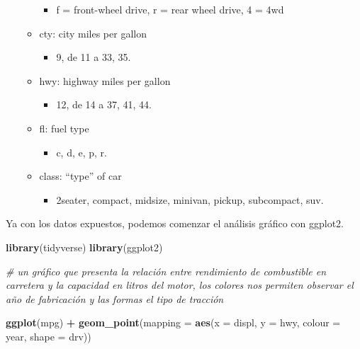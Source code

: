 \documentclass[
]{article}
\newenvironment{Shaded}{\begin{snugshade}}{\end{snugshade}}
\newcommand{\CommentTok}[1]{\textcolor[rgb]{0.56,0.35,0.01}{\textit{#1}}}
\newcommand{\DataTypeTok}[1]{\textcolor[rgb]{0.13,0.29,0.53}{#1}}
\newcommand{\KeywordTok}[1]{\textcolor[rgb]{0.13,0.29,0.53}{\textbf{#1}}}
\newcommand{\NormalTok}[1]{#1}
\newcommand{\OperatorTok}[1]{\textcolor[rgb]{0.81,0.36,0.00}{\textbf{#1}}}
\newcommand{\StringTok}[1]{\textcolor[rgb]{0.31,0.60,0.02}{#1}}
\providecommand{\tightlist}{%
  \setlength{\itemsep}{0pt}\setlength{\parskip}{0pt}}
\begin{document}
\begin{itemize}
\begin{itemize}
    \begin{itemize}
    \tightlist
    \item
      f = front-wheel drive, r = rear wheel drive, 4 = 4wd
    \end{itemize}
  \item
    cty: city miles per gallon

    \begin{itemize}
    \tightlist
    \item
      9, de 11 a 33, 35.
    \end{itemize}
  \item
    hwy: highway miles per gallon

    \begin{itemize}
    \tightlist
    \item
      12, de 14 a 37, 41, 44.
    \end{itemize}
  \item
    fl: fuel type

    \begin{itemize}
    \tightlist
    \item
      c, d, e, p, r.
    \end{itemize}
  \item
    class: ``type'' of car

    \begin{itemize}
    \tightlist
    \item
      2seater, compact, midsize, minivan, pickup, subcompact, suv.
    \end{itemize}
  \end{itemize}
\end{itemize}

Ya con los datos expuestos, podemos comenzar el análisis gráfico con
ggplot2.

\begin{Shaded}
\begin{Highlighting}[]
\KeywordTok{library}\NormalTok{(tidyverse)}
\KeywordTok{library}\NormalTok{(ggplot2)}

\CommentTok{\# un gráfico que presenta la relación entre rendimiento de combustible  en carretera y la capacidad en litros del motor, los colores nos permiten observar el año de fabricación y las formas el tipo de tracción}

\KeywordTok{ggplot}\NormalTok{(mpg) }\OperatorTok{+}
\StringTok{  }\KeywordTok{geom\_point}\NormalTok{(}\DataTypeTok{mapping =} \KeywordTok{aes}\NormalTok{(}\DataTypeTok{x =}\NormalTok{ displ, }\DataTypeTok{y =}\NormalTok{ hwy, }\DataTypeTok{colour =}\NormalTok{ year, }\DataTypeTok{shape =}\NormalTok{ drv))}
\end{Highlighting}
\end{Shaded}
\end{document}
